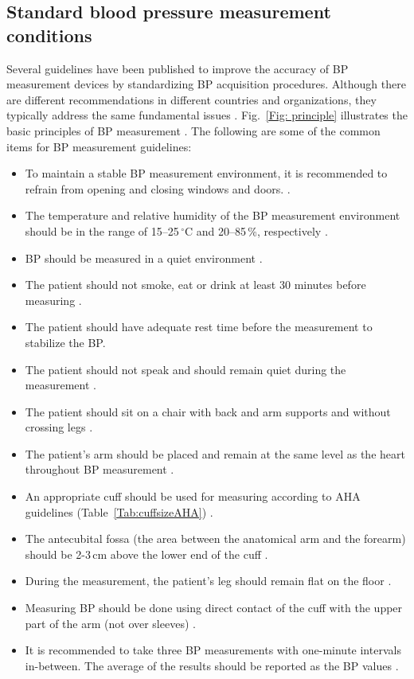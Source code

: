 \documentclass[journal,article,moreauthors]{Definitions/mdpi}
\begin{document}
\subsection{Standard blood pressure measurement conditions}
Several guidelines have been published to improve the accuracy of BP measurement devices by standardizing BP acquisition procedures. Although there are different recommendations in different countries and organizations, they typically address the same fundamental issues \citep{Wagner2012-id}. Fig.~\ref{Fig: principle} illustrates the basic principles of BP measurement \citep{Stergiou2021-fl}. The following are some of the common items for BP measurement guidelines: 
\begin{itemize}
    \item To maintain a stable BP measurement environment, it is recommended to refrain from opening and closing windows and doors. \citep{Kumar2021-em}.
    \item The temperature and relative humidity of the BP measurement environment should be in the range of 15–25\,$^{\circ}$C and 20–85\,\%, respectively \citep{Kumar2021-em}. 
    \item BP should be measured in a quiet environment \citep{Liu2022-xk, Stergiou2021-fl}.
    \item The patient should not smoke, eat or drink at least 30 minutes before measuring \citep{Stergiou2021-fl}. 
    \item The patient should have adequate rest time before the measurement to stabilize the BP.
    \item The patient should not speak and should remain quiet during the measurement \citep{Stergiou2021-fl}.
    \item The patient should sit on a chair with back and arm supports and without crossing legs \citep{Liu2022-xk}.
    \item The patient's arm should be placed and remain at the same level as the heart throughout BP measurement \citep{Kumar2021-em}.
    \item An appropriate cuff should be used for measuring according to AHA guidelines (Table~\ref{Tab:cuffsizeAHA}) \citep{Kumar2021-em}.
    \item The antecubital fossa (the area between the anatomical arm and the forearm) should be 2-3\,cm above the lower end of the cuff \citep{muntner2019measurement}. 
    \item During the measurement, the patient's leg should remain flat on the floor \citep{Stergiou2021-fl}.
    \item Measuring BP should be done using direct contact of the cuff with the upper part of the arm (not over sleeves) \citep{Liu2022-xk}. 
    \item It is recommended to take three BP measurements with one-minute intervals in-between. The average of the results should be reported as the BP values \citep{Stergiou2021-fl, Liu2022-xk}.
\end{itemize}
\end{document}
